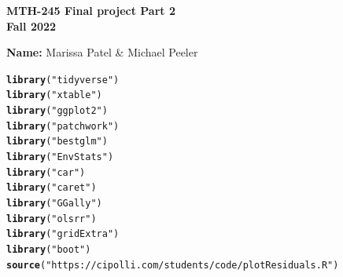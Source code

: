 \documentclass{article}\usepackage[]{graphicx}\usepackage[]{xcolor}
\makeatletter
\newcommand{\hlstr}[1]{\textcolor[rgb]{0.192,0.494,0.8}{#1}}%
\newcommand{\hlstd}[1]{\textcolor[rgb]{0.345,0.345,0.345}{#1}}%
\newcommand{\hlkwd}[1]{\textcolor[rgb]{0.737,0.353,0.396}{\textbf{#1}}}%
\newenvironment{kframe}{%
 \def\at@end@of@kframe{}%
 \ifinner\ifhmode%
  \def\at@end@of@kframe{\end{minipage}}%
  \begin{minipage}{\columnwidth}%
 \fi\fi%
 \def\FrameCommand##1{\hskip\@totalleftmargin \hskip-\fboxsep
 \colorbox{shadecolor}{##1}\hskip-\fboxsep
     \hskip-\linewidth \hskip-\@totalleftmargin \hskip\columnwidth}%
 \MakeFramed {\advance\hsize-\width
   \@totalleftmargin\z@ \linewidth\hsize
   \@setminipage}}%
 {\par\unskip\endMakeFramed%
 \at@end@of@kframe}
\newenvironment{knitrout}{}{} %
\makeatother
\begin{document}
\begin{center}
\textbf{MTH-245 Final project Part 2} \\
\textbf{Fall 2022}\\
\end{center}

\vspace{.3cm}

\textbf{Name: } Marissa Patel \& Michael Peeler 

\vspace{.3cm}

\begin{knitrout}
\color{fgcolor}\begin{kframe}
\begin{alltt}
\hlkwd{library}\hlstd{(}\hlstr{"tidyverse"}\hlstd{)}
\hlkwd{library}\hlstd{(}\hlstr{"xtable"}\hlstd{)}
\hlkwd{library}\hlstd{(}\hlstr{"ggplot2"}\hlstd{)}
\hlkwd{library}\hlstd{(}\hlstr{"patchwork"}\hlstd{)}
\hlkwd{library}\hlstd{(}\hlstr{"bestglm"}\hlstd{)}
\hlkwd{library}\hlstd{(}\hlstr{"EnvStats"}\hlstd{)}
\hlkwd{library}\hlstd{(}\hlstr{"car"}\hlstd{)}
\hlkwd{library}\hlstd{(}\hlstr{"caret"}\hlstd{)}
\hlkwd{library}\hlstd{(}\hlstr{"GGally"}\hlstd{)}
\hlkwd{library}\hlstd{(}\hlstr{"olsrr"}\hlstd{)}
\hlkwd{library}\hlstd{(}\hlstr{"gridExtra"}\hlstd{)}
\hlkwd{library}\hlstd{(}\hlstr{"boot"}\hlstd{)}
\hlkwd{source}\hlstd{(}\hlstr{"https://cipolli.com/students/code/plotResiduals.R"}\hlstd{)}
\end{alltt}
\end{kframe}
\end{knitrout}
\end{document}
